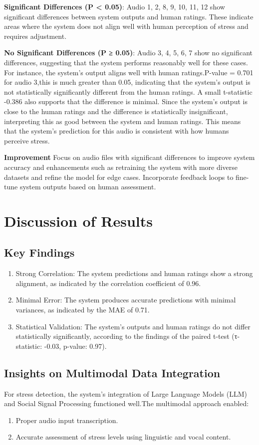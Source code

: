 \documentclass[Arial,12pt,openright,twoside]{book}
\begin{document}
\textbf{Significant Differences (P < 0.05)}: Audio 1, 2, 8, 9, 10, 11, 12 show significant differences between system outputs and human ratings. These indicate areas where the system does not align well with human perception of stress and requires adjustment.\par
\textbf{No Significant Differences (P ≥ 0.05)}: Audio 3, 4, 5, 6, 7 show no significant differences, suggesting that the system performs reasonably well for these cases. For instance, the system's output aligns well with human ratings.P-value = 0.701 for audio 3,this is much greater than 0.05, indicating that the system's output is not statistically significantly different from the human ratings. A small t-statistic -0.386 also supports that the difference is minimal. Since the system's output is close to the human ratings and the difference is statistically insignificant, interpreting this as good between the system and human ratings. This means that the system's prediction for this audio is consistent with how humans perceive stress. \par
\textbf{Improvement}
Focus on audio files with significant differences to improve system accuracy and enhancements such as retraining the system with more diverse datasets and refine the model for edge cases. Incorporate feedback loops to fine-tune system outputs based on human assessment.

  \section{Discussion of Results}
    \subsection{Key Findings}
    \begin{enumerate}
\item Strong Correlation: The system predictions and human ratings show a strong alignment, as indicated by the correlation coefficient of 0.96. \item  Minimal Error: The system produces accurate predictions with minimal variances, as indicated by the MAE of 0.71. 
\item Statistical Validation: The system's outputs and human ratings do not differ statistically significantly, according to the findings of the paired t-test (τ-statistic: -0.03, p-value: 0.97). 
\end{enumerate}
 \subsection{Insights on Multimodal Data Integration}
For stress detection, the system's integration of Large Language Models (LLM) and Social Signal Processing functioned well.The multimodal approach enabled:
\begin{enumerate}
\item Proper audio input transcription. 
 \item  Accurate assessment of stress levels using linguistic and vocal content. 
\end{enumerate}
\end{document}
